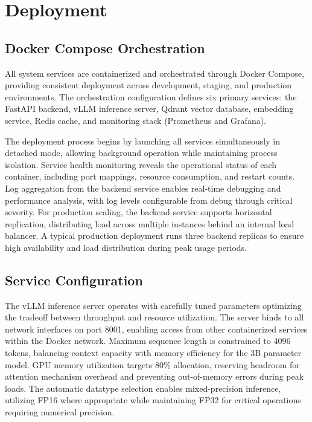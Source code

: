 \documentclass[12pt,a4paper]{article}
\begin{document}
\section{Deployment}

\subsection{Docker Compose Orchestration}

All system services are containerized and orchestrated through Docker Compose, providing consistent deployment across development, staging, and production environments. The orchestration configuration defines six primary services: the FastAPI backend, vLLM inference server, Qdrant vector database, embedding service, Redis cache, and monitoring stack (Prometheus and Grafana).

The deployment process begins by launching all services simultaneously in detached mode, allowing background operation while maintaining process isolation. Service health monitoring reveals the operational status of each container, including port mappings, resource consumption, and restart counts. Log aggregation from the backend service enables real-time debugging and performance analysis, with log levels configurable from debug through critical severity. For production scaling, the backend service supports horizontal replication, distributing load across multiple instances behind an internal load balancer. A typical production deployment runs three backend replicas to ensure high availability and load distribution during peak usage periods.

\subsection{Service Configuration}

The vLLM inference server operates with carefully tuned parameters optimizing the tradeoff between throughput and resource utilization. The server binds to all network interfaces on port 8001, enabling access from other containerized services within the Docker network. Maximum sequence length is constrained to 4096 tokens, balancing context capacity with memory efficiency for the 3B parameter model. GPU memory utilization targets 80\% allocation, reserving headroom for attention mechanism overhead and preventing out-of-memory errors during peak loads. The automatic datatype selection enables mixed-precision inference, utilizing FP16 where appropriate while maintaining FP32 for critical operations requiring numerical precision.
\end{document}
